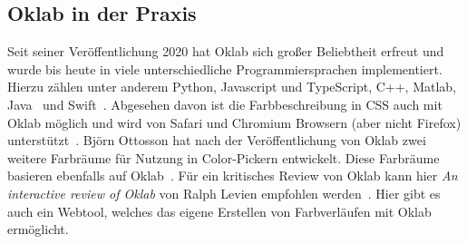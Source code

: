 \documentclass[12pt, a4paper, ngerman]{article}
\begin{document}
\subsection{Oklab in der Praxis}
Seit seiner Veröffentlichung 2020 hat Oklab sich großer Beliebtheit erfreut und 
wurde bis heute in viele unterschiedliche Programmiersprachen implementiert.
Hierzu zählen unter anderem Python, Javascript und TypeScript, C++, Matlab, Java~\cite{Oklab_2020} und Swift~\cite{Ferrell_2021}. 
Abgesehen davon ist die Farbbeschreibung in CSS auch mit Oklab möglich und wird von Safari und Chromium Browsern (aber nicht Firefox) unterstützt~\cite{oklab-CSS_2023}. 
Björn Ottosson hat nach der Veröffentlichung von Oklab zwei weitere Farbräume für Nutzung in Color-Pickern entwickelt. 
Diese Farbräume basieren ebenfalls auf Oklab~\cite{Ottosson_2021}. 
Für ein kritisches Review von Oklab kann hier \emph{An interactive review of Oklab} von Ralph Levien empfohlen werden~\cite{Levien_2021}. 
Hier gibt es auch ein Webtool, welches das eigene Erstellen von Farbverläufen mit Oklab ermöglicht.

\newpage
\printbibliography
\end{document}
